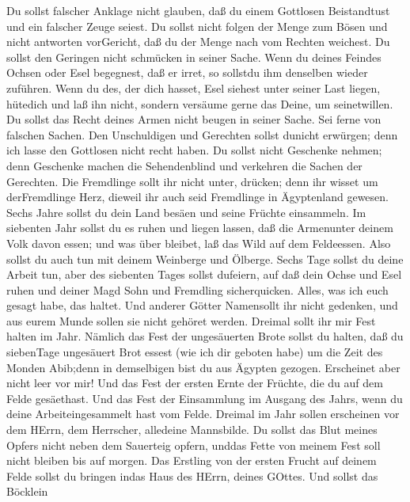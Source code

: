  Du sollst falscher Anklage nicht glauben, daß du einem
Gottlosen Beistandtust und ein falscher Zeuge seiest.  Du
sollst nicht folgen der Menge zum Bösen und nicht antworten vorGericht,
daß du der Menge nach vom Rechten weichest.  Du sollst den
Geringen nicht schmücken in seiner Sache.  Wenn du deines
Feindes Ochsen oder Esel begegnest, daß er irret, so sollstdu ihm
denselben wieder zuführen.  Wenn du des, der dich hasset,
Esel siehest unter seiner Last liegen, hütedich und laß ihn nicht,
sondern versäume gerne das Deine, um seinetwillen.  Du
sollst das Recht deines Armen nicht beugen in seiner Sache. 
Sei ferne von falschen Sachen. Den Unschuldigen und Gerechten sollst
dunicht erwürgen; denn ich lasse den Gottlosen nicht recht haben.
 Du sollst nicht Geschenke nehmen; denn Geschenke machen die
Sehendenblind und verkehren die Sachen der Gerechten.  Die
Fremdlinge sollt ihr nicht unter, drücken; denn ihr wisset um
derFremdlinge Herz, dieweil ihr auch seid Fremdlinge in Ägyptenland
gewesen.  Sechs Jahre sollst du dein Land besäen und seine
Früchte einsammeln.  Im siebenten Jahr sollst du es ruhen
und liegen lassen, daß die Armenunter deinem Volk davon essen; und was
über bleibet, laß das Wild auf dem Feldeessen. Also sollst du auch tun
mit deinem Weinberge und Ölberge.  Sechs Tage sollst du
deine Arbeit tun, aber des siebenten Tages sollst dufeiern, auf daß dein
Ochse und Esel ruhen und deiner Magd Sohn und Fremdling sicherquicken.
 Alles, was ich euch gesagt habe, das haltet. Und anderer
Götter Namensollt ihr nicht gedenken, und aus eurem Munde sollen sie
nicht gehöret werden.  Dreimal sollt ihr mir Fest halten im
Jahr.  Nämlich das Fest der ungesäuerten Brote sollst du
halten, daß du siebenTage ungesäuert Brot essest (wie ich dir geboten
habe) um die Zeit des Monden Abib;denn in demselbigen bist du aus
Ägypten gezogen. Erscheinet aber nicht leer vor mir!  Und
das Fest der ersten Ernte der Früchte, die du auf dem Felde gesäethast.
Und das Fest der Einsammlung im Ausgang des Jahrs, wenn du deine
Arbeiteingesammelt hast vom Felde.  Dreimal im Jahr sollen
erscheinen vor dem HErrn, dem Herrscher, alledeine Mannsbilde.
 Du sollst das Blut meines Opfers nicht neben dem Sauerteig
opfern, unddas Fette von meinem Fest soll nicht bleiben bis auf morgen.
 Das Erstling von der ersten Frucht auf deinem Felde sollst
du bringen indas Haus des HErrn, deines GOttes. Und sollst das Böcklein
